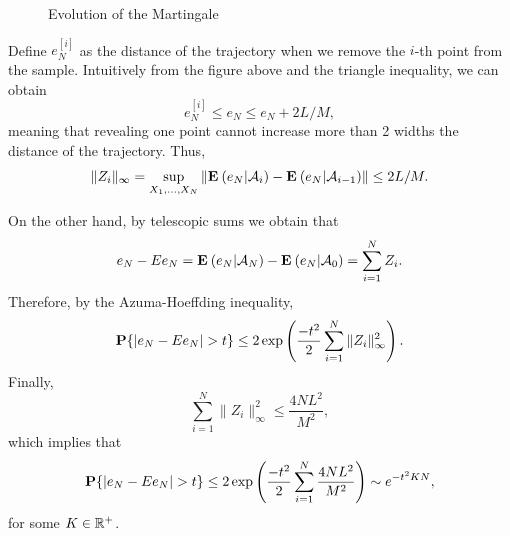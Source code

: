 \begin{figure}[h]
    \caption{Evolution of the Martingale}
\end{figure}

Define $e_N^{[i]}$ as the distance of the trajectory when we remove the $i$-th point from the sample. Intuitively from the figure above and the triangle inequality, we can obtain
\[ e_N^{[i]} \leq e_N \leq e_N + 2 L/M, \]
meaning that revealing one point cannot increase more than 2 widths the distance of the trajectory. Thus,
\[ \|Z_i\|_\infty = \sup_{X_1,\ldots, X_N} \|\E (e_N | \A_i) - \E (e_N | \A_{i-1})\| \leq 2L/M. \]

On the other hand, by telescopic sums we obtain that 
\[  e_N - E e_N = \E (e_N | \A_N) - \E (e_N | \A_{0}) = \sum_{i = 1}^{N} Z_i.\]
Therefore, by the Azuma-Hoeffding inequality,
\[ \P \{ |e_N - E e_N| > t \} \leq 2\exp\left(\frac{-t^2}{2}\sum_{i = 1}^{N} \|Z_i\|_{\infty}^2 \right). \] 
Finally,
\[ \sum_{i = 1}^{N} \|Z_i\|_{\infty}^2 \leq \frac{4NL^2}{M^2}, \]
which implies that
\[\P \{ |e_N - E e_N| > t \} \leq 2\exp\left(\frac{-t^2}{2}\sum_{i = 1}^{N} \frac{4NL^2}{M^2} \right) \sim e^{-t^{2} K N}, \] 
for some $K\in \R^+$.